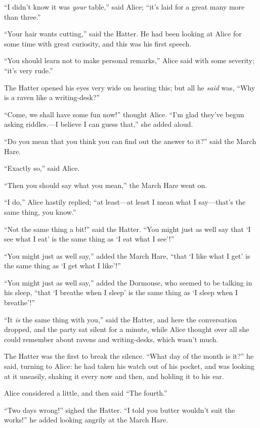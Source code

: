 \documentclass[book, 20pt]{extbook}
\begin{document}
``I didn't know it was \emph{your} table,'' said Alice; ``it's laid for
a great many more than three.''

``Your hair wants cutting,'' said the Hatter. He had been looking at
Alice for some time with great curiosity, and this was his first speech.

``You should learn not to make personal remarks,'' Alice said with some
severity; ``it's very rude.''

The Hatter opened his eyes very wide on hearing this; but all he
\emph{said} was, ``Why is a raven like a writing-desk?''

``Come, we shall have some fun now!'' thought Alice. ``I'm glad they've
begun asking riddles.---I believe I can guess that,'' she added aloud.

``Do you mean that you think you can find out the answer to it?'' said
the March Hare.

``Exactly so,'' said Alice.

``Then you should say what you mean,'' the March Hare went on.

``I do,'' Alice hastily replied; ``at least---at least I mean what I
say---that's the same thing, you know.''

``Not the same thing a bit!'' said the Hatter. ``You might just as well
say that `I see what I eat' is the same thing as `I eat what I see'!''

``You might just as well say,'' added the March Hare, ``that `I like
what I get' is the same thing as `I get what I like'!''

``You might just as well say,'' added the Dormouse, who seemed to be
talking in his sleep, ``that `I breathe when I sleep' is the same thing
as `I sleep when I breathe'!''

``It \emph{is} the same thing with you,'' said the Hatter, and here the
conversation dropped, and the party sat silent for a minute, while Alice
thought over all she could remember about ravens and writing-desks,
which wasn't much.

The Hatter was the first to break the silence. ``What day of the month
is it?'' he said, turning to Alice: he had taken his watch out of his
pocket, and was looking at it uneasily, shaking it every now and then,
and holding it to his ear.

Alice considered a little, and then said ``The fourth.''

``Two days wrong!'' sighed the Hatter. ``I told you butter wouldn't suit
the works!'' he added looking angrily at the March Hare.
\end{document}
